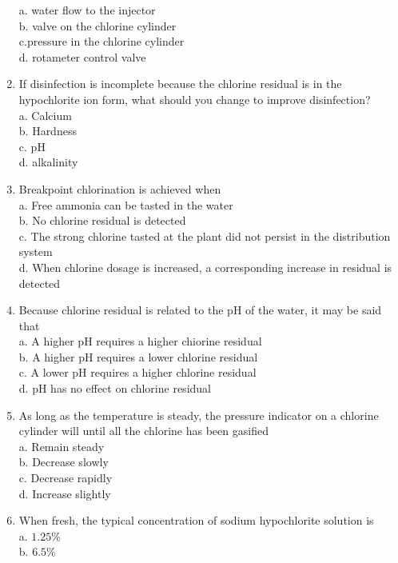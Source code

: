 \begin{enumerate}[1.]
a. water flow to the injector\\
b. valve on the chlorine cylinder\\
c.pressure in the chlorine cylinder\\
d. rotameter control valve\\
\item If disinfection is incomplete because the chlorine residual is in the hypochlorite ion form, what should you change to improve disinfection?\\
a. Calcium\\
b. Hardness\\
c. $\mathrm{pH}$\\
d. alkalinity\\
\item Breakpoint chlorination is achieved when\\
a. Free ammonia can be tasted in the water\\
b. No chlorine residual is detected\\
c. The strong chlorine tasted at the plant did not persist in the distribution system\\
d. When chlorine dosage is increased, a corresponding increase in residual is detected\\
\item Because chlorine residual is related to the $\mathrm{pH}$ of the water, it may be said that\\
a. A higher $\mathrm{pH}$ requires a higher chiorine residual\\
b. A higher $\mathrm{pH}$ requires a lower chlorine residual\\
c. A lower $\mathrm{pH}$ requires a higher chlorine residual\\
d. $\mathrm{pH}$ has no effect on chlorine residual\\
\item As long as the temperature is steady, the pressure indicator on a chlorine cylinder will until all the chlorine has been gasified\\
a. Remain steady\\
b. Decrease slowly\\
c. Decrease rapidly\\
d. Increase slightly\\
\item When fresh, the typical concentration of sodium hypochlorite solution is\\
a. $1.25 \%$\\
b. $6.5 \%$\\

\end{enumerate}
